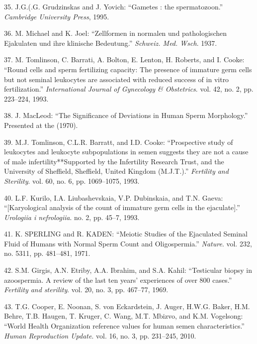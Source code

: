 \documentclass[12pt,a4paper,twoside]{ugathesis}
\theoremstyle{definition}
\theoremstyle{definition}
\theoremstyle{definition}
\theoremstyle{remark}
\begin{document}
\hypertarget{ref-Grudzinskas1995}{}
35. J.G.(.G. Grudzinskas and J. Yovich: ``Gametes : the spermatozoon.''
\emph{Cambridge University Press}, 1995.

\hypertarget{ref-Michael1937}{}
36. M. Michael and K. Joel: ``Zellformen in normalen und pathologischen
Ejakulaten und ihre klinische Bedeutung.'' \emph{Schweiz. Med. Wsch}.
1937.

\hypertarget{ref-Tomlinson1993a}{}
37. M. Tomlinson, C. Barrati, A. Bolton, E. Lenton, H. Roberts, and I.
Cooke: ``Round cells and sperm fertilizing capacity: The presence of
immature germ cells but not seminal leukocytes are associated with
reduced success of in vitro fertilization.'' \emph{International Journal
of Gynecology \& Obstetrics}. vol. 42, no. 2, pp. 223--224, 1993.

\hypertarget{ref-MacLeod1970}{}
38. J. MacLeod: ``The Significance of Deviations in Human Sperm
Morphology.'' Presented at the (1970).

\hypertarget{ref-Tomlinson1993}{}
39. M.J. Tomlinson, C.L.R. Barratt, and I.D. Cooke: ``Prospective study
of leukocytes and leukocyte subpopulations in semen suggests they are
not a cause of male infertility**Supported by the Infertility Research
Trust, and the University of Sheffield, Sheffield, United Kingdom
(M.J.T.).'' \emph{Fertility and Sterility}. vol. 60, no. 6, pp.
1069--1075, 1993.

\hypertarget{ref-Kurilo}{}
40. L.F. Kurilo, I.A. Liubashevskaia, V.P. Dubinskaia, and T.N. Gaeva:
``{[}Karyological analysis of the count of immature germ cells in the
ejaculate{]}.'' \emph{Urologiia i nefrologiia}. no. 2, pp. 45--7, 1993.

\hypertarget{ref-SPERLING1971}{}
41. K. SPERLING and R. KADEN: ``Meiotic Studies of the Ejaculated
Seminal Fluid of Humans with Normal Sperm Count and Oligospermia.''
\emph{Nature}. vol. 232, no. 5311, pp. 481--481, 1971.

\hypertarget{ref-Girgis}{}
42. S.M. Girgis, A.N. Etriby, A.A. Ibrahim, and S.A. Kahil: ``Testicular
biopsy in azoospermia. A review of the last ten years' experiences of
over 800 cases.'' \emph{Fertility and sterility}. vol. 20, no. 3, pp.
467--77, 1969.

\hypertarget{ref-Cooper2010}{}
43. T.G. Cooper, E. Noonan, S. von Eckardstein, J. Auger, H.W.G. Baker,
H.M. Behre, T.B. Haugen, T. Kruger, C. Wang, M.T. Mbizvo, and K.M.
Vogelsong: ``World Health Organization reference values for human semen
characteristics.'' \emph{Human Reproduction Update}. vol. 16, no. 3, pp.
231--245, 2010.
\end{document}
